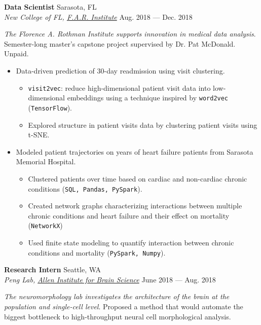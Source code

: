 \documentclass[a4paper,12pt]{article}
\newcommand{\ressubheading}[4]{{\begin{minipage}{\textwidth}
                                    \textbf{#1} \hfill #2 \\
                                    \textit{#3} \hfill #4 \\
\end{minipage}}}
\begin{document}
    \ressubheading{Data Scientist}{Sarasota, FL}{New College of FL, \href{farinstitute.org}{F.A.R. Institute}}{Aug. 2018 --- Dec. 2018}

    \vspace{-6pt} \textit{The Florence A. Rothman Institute supports innovation in medical data analysis}. Semester-long master's capstone project supervised by Dr. Pat McDonald. Unpaid.


    \begin{itemize}
        \item Data-driven prediction of 30-day readmission using visit clustering.

        \begin{itemize}
            \item \texttt{visit2vec}: reduce high-dimensional patient visit data into low-dimensional embeddings using a technique inspired by \texttt{word2vec} (\texttt{TensorFlow}).
            \item Explored structure in patient visits data by clustering patient visits using t-SNE\@.
        \end{itemize}



        \item Modeled patient trajectories on years of heart failure patients from Sarasota Memorial Hospital.
        \begin{itemize}
            \item Clustered patients over time based on cardiac and non-cardiac chronic conditions (\texttt{SQL, Pandas, PySpark}).
            \item Created network graphs characterizing interactions between multiple chronic conditions and heart failure and their effect on mortality (\texttt{NetworkX})
            \item Used finite state modeling to quantify interaction between chronic conditions and mortality (\texttt{PySpark, Numpy}).
        \end{itemize}

    \end{itemize}

    \ressubheading{Research Intern}{Seattle, WA}{Peng Lab, \href{alleninstitute.org}{Allen Institute for Brain Science}}{June 2018 --- Aug. 2018}

    \vspace{-6pt} \textit{The neuromorphology lab investigates the architecture of the brain at the population and single-cell level}. Proposed a method that would automate the biggest bottleneck to high-throughput neural cell morphological analysis.
\end{document}
